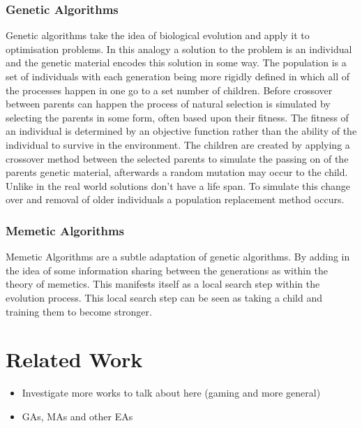 \documentclass[a4paper]{article}
\begin{document}
\subsubsection{Genetic Algorithms}
Genetic algorithms take the idea of biological evolution and apply it to optimisation problems.
In this analogy a solution to the problem is an individual and the genetic material encodes this solution in some way.
The population is a set of individuals with each generation being more rigidly defined in which all of the processes happen in one go to a set number of children.
Before crossover between parents can happen the process of natural selection is simulated by selecting the parents in some form, often based upon their fitness.
The fitness of an individual is determined by an objective function rather than the ability of the individual to survive in the environment.
The children are created by applying a crossover method between the selected parents to simulate the passing on of the parents genetic material, afterwards a random mutation may occur to the child.
Unlike in the real world solutions don't have a life span.
To simulate this change over and removal of older individuals a population replacement method occurs.
\subsubsection{Memetic Algorithms}
Memetic Algorithms are a subtle adaptation of genetic algorithms.
By adding in the idea of some information sharing between the generations as within the theory of memetics.
This manifests itself as a local search step within the evolution process.
This local search step can be seen as taking a child and training them to become stronger.

\section{Related Work}
\begin{itemize}
   \item Investigate more works to talk about here (gaming and more general)
   \item GAs, MAs and other EAs
\end{itemize}
\end{document}
